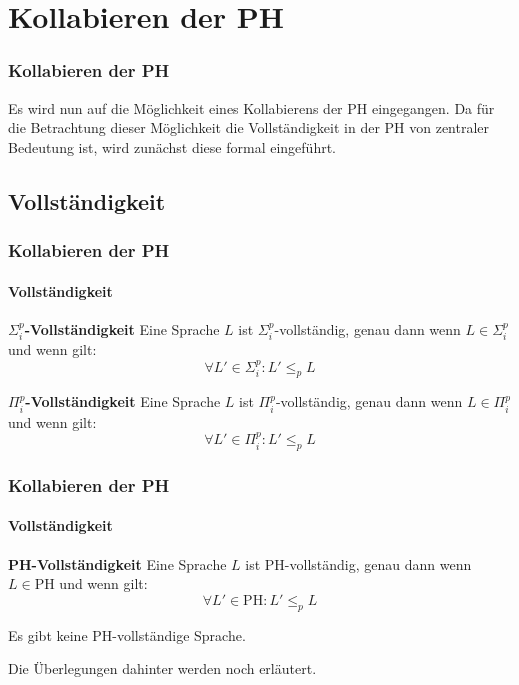 \section{Kollabieren der PH}
\begin{frame}
    \frametitle{Kollabieren der PH}
    Es wird nun auf die Möglichkeit eines Kollabierens der PH eingegangen.
    Da für die Betrachtung dieser Möglichkeit die Vollständigkeit in der PH von zentraler Bedeutung ist, wird zunächst diese formal eingeführt.
\end{frame}

\subsection{Vollständigkeit}
\begin{frame}
    \frametitle{Kollabieren der PH}
    \framesubtitle{Vollständigkeit}
    \begin{block}{\textbf{$\Sigma^p_i$-Vollständigkeit}}
        Eine Sprache $L$ ist $\Sigma^p_i$-vollständig, genau dann wenn $L \in \Sigma^p_i$ und wenn gilt:
        $$
        \forall L' \in \Sigma^p_i: L' \leq_p L
        $$
    \end{block}
    \begin{block}{\textbf{$\Pi^p_i$-Vollständigkeit}}
        Eine Sprache $L$ ist $\Pi^p_i$-vollständig, genau dann wenn $L \in \Pi^p_i$ und wenn gilt:
        $$
        \forall L' \in \Pi^p_i: L' \leq_p L
        $$
    \end{block}
    
\end{frame}

\begin{frame}
    \frametitle{Kollabieren der PH}
    \framesubtitle{Vollständigkeit}
    \begin{block}{\textbf{PH-Vollständigkeit}}
        Eine Sprache $L$ ist PH-vollständig, genau dann wenn $L \in \text{PH}$ und wenn gilt:
        $$
        \forall L' \in \text{PH}: L' \leq_p L
        $$
    \end{block}
    
    \begin{conjecture}
        Es gibt keine PH-vollständige Sprache.
    \end{conjecture}
    Die Überlegungen dahinter werden noch erläutert.
\end{frame}

